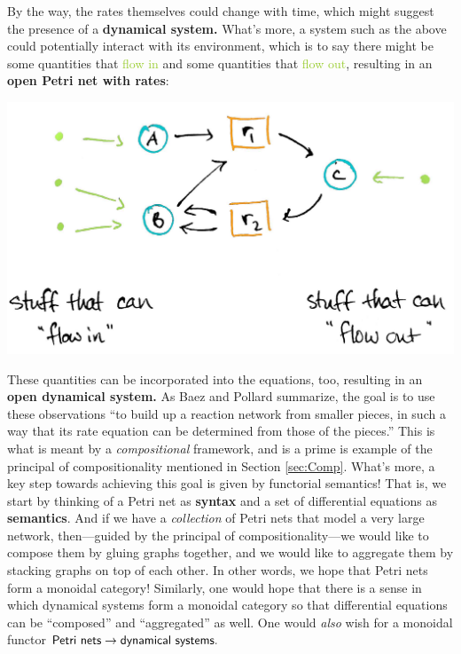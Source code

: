 \documentclass{tufte-handout-tai}
\newcommand{\cat}[1]{{\normalfont\textsf{#1}}}
\theoremstyle{plain}
\theoremstyle{definition}
\theoremstyle{remark}
\begin{document}
By the way, the rates themselves could change with time, which might suggest the presence of a \textbf{dynamical system.}  What's more, a system such as the above could potentially interact with its environment, which is to say there might be some quantities that \textcolor{YellowGreen}{flow in} and some quantities that \textcolor{YellowGreen}{flow out}, resulting in an \textbf{open Petri net with rates}:
\begin{center}
\includegraphics[width=!,totalheight=!,scale=0.1]{petri2.jpg}
\end{center}
These quantities can be incorporated into the equations, too, resulting in an \textbf{open dynamical system.} As Baez and Pollard summarize, the goal is to use these observations ``to build up a reaction network from smaller pieces, in such a way that its rate equation can be determined from those of the pieces.'' This is what is meant by a \textit{compositional} framework, and is a prime is example of the principal of compositionality mentioned in Section \ref{sec:Comp}.
What's more, a key step towards achieving this goal is given by functorial semantics! That is, we start by thinking of a Petri net as \textbf{syntax} and a set of differential equations as  \textbf{semantics}. And if we have a \textit{collection} of Petri nets that model a very large network, then---guided by the principal of compositionality---we would like to compose them by gluing graphs together, and we would like to aggregate them by stacking graphs on top of each other. In other words, we hope that Petri nets form a monoidal category! Similarly, one would hope that there is a sense in which dynamical systems form a monoidal category so that differential equations can be ``composed'' and ``aggregated'' as well. One would \textit{also} wish for a monoidal functor $\cat{Petri nets}\to\cat{dynamical systems}.$ 
\end{document}
